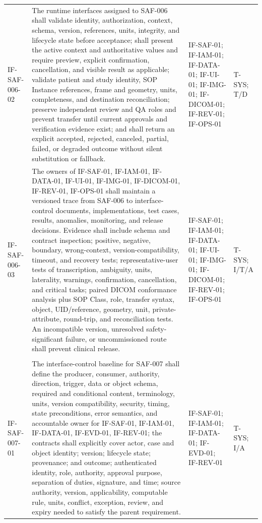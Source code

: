 \documentclass[11pt,letterpaper]{article}
\begin{document}
\begin{scriptsize}
\begin{longtable}{@{}L{0.14\textwidth}L{0.49\textwidth}L{0.19\textwidth}L{0.10\textwidth}@{}}
\mbox{IF-SAF-006-02} & The runtime interfaces assigned to SAF-006 shall validate identity, authorization, context, schema, version, references, units, integrity, and lifecycle state before acceptance; shall present the active context and authoritative values and require preview, explicit confirmation, cancellation, and visible result as applicable; validate patient and study identity, SOP Instance references, frame and geometry, units, completeness, and destination reconciliation; preserve independent review and QA roles and prevent transfer until current approvals and verification evidence exist; and shall return an explicit accepted, rejected, canceled, partial, failed, or degraded outcome without silent substitution or fallback. & IF-SAF-01; IF-IAM-01; IF-DATA-01; IF-UI-01; IF-IMG-01; IF-DICOM-01; IF-REV-01; IF-OPS-01 & T-SYS; T\slash\allowbreak{}D \\
\addlinespace[2pt]
\mbox{IF-SAF-006-03} & The owners of IF-SAF-01, IF-IAM-01, IF-DATA-01, IF-UI-01, IF-IMG-01, IF-DICOM-01, IF-REV-01, IF-OPS-01 shall maintain a versioned trace from SAF-006 to interface-control documents, implementations, test cases, results, anomalies, monitoring, and release decisions. Evidence shall include schema and contract inspection; positive, negative, boundary, wrong-context, version-compatibility, timeout, and recovery tests; representative-user tests of transcription, ambiguity, units, laterality, warnings, confirmation, cancellation, and critical tasks; paired DICOM conformance analysis plus SOP Class, role, transfer syntax, object, UID\slash\allowbreak{}reference, geometry, unit, private-attribute, round-trip, and reconciliation tests. An incompatible version, unresolved safety-significant failure, or uncommissioned route shall prevent clinical release. & IF-SAF-01; IF-IAM-01; IF-DATA-01; IF-UI-01; IF-IMG-01; IF-DICOM-01; IF-REV-01; IF-OPS-01 & T-SYS; I\slash\allowbreak{}T\slash\allowbreak{}A \\
\addlinespace[2pt]
 \\
\addlinespace[2pt]
\mbox{IF-SAF-007-01} & The interface-control baseline for SAF-007 shall define the producer, consumer, authority, direction, trigger, data or object schema, required and conditional content, terminology, units, version compatibility, security, timing, state preconditions, error semantics, and accountable owner for IF-SAF-01, IF-IAM-01, IF-DATA-01, IF-EVD-01, IF-REV-01; the contracts shall explicitly cover actor, case and object identity; version; lifecycle state; provenance; and outcome; authenticated identity, role, authority, approval purpose, separation of duties, signature, and time; source authority, version, applicability, computable rule, units, conflict, exception, review, and expiry needed to satisfy the parent requirement. & IF-SAF-01; IF-IAM-01; IF-DATA-01; IF-EVD-01; IF-REV-01 & T-SYS; I\slash\allowbreak{}A \\

\end{longtable}
\end{scriptsize}
\end{document}
